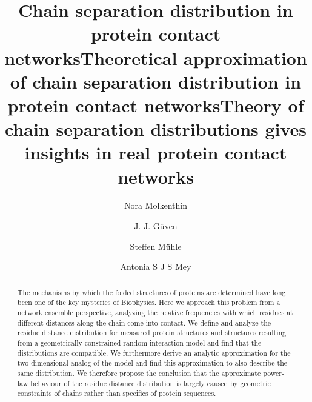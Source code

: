 \documentclass[
reprint,
twocolumn,
amsmath,amssymb,superscriptaddress,aps,
pre]{revtex4-1}
\begin{document}
\title{Chain separation distribution in protein contact networks}
\title{Theoretical approximation of chain separation distribution in protein contact networks}
\title{Theory of chain separation distributions gives insights in real protein contact networks}
\author{Nora Molkenthin}
\author{J. J.  Güven}
\author{Steffen Mühle}
\author{Antonia S J S Mey}

\begin{abstract}
The mechanisms by which the folded structures of proteins are determined have long been one of the key mysteries of Biophysics. Here we approach this problem from a network ensemble perspective, analyzing the relative frequencies with which residues at different distances along the chain come into contact. We define and analyze the residue distance distribution for measured protein structures and structures resulting from a geometrically constrained random interaction model and find that the distributions are compatible. We furthermore derive an analytic approximation for the two dimensional analog of the model and find this approximation to also describe the same distribution. We therefore propose the conclusion that the approximate power-law behaviour of the residue distance distribution is largely caused by geometric constraints of chains rather than specifics of protein sequences.
\end{abstract}
\maketitle
\end{document}
